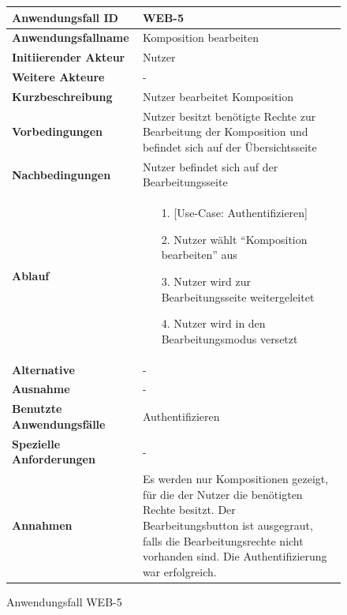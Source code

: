 \begin{figure}[h]
	\centering
	\begin{tabularx}{\textwidth}{ X | X }
		\textbf{Anwendungsfall ID} & WEB-5 \\ \hline
		\textbf{Anwendungsfallname} & Komposition bearbeiten \\ \hline
		\textbf{Initiierender Akteur} & Nutzer \\ \hline
		\textbf{Weitere Akteure} & - \\ \hline
		\textbf{Kurzbeschreibung} & Nutzer bearbeitet Komposition \\ \hline
		\textbf{Vorbedingungen} & Nutzer besitzt benötigte Rechte zur Bearbeitung der Komposition und befindet sich auf der Übersichtsseite \\ \hline
		\textbf{Nachbedingungen} & Nutzer befindet sich auf der Bearbeitungsseite \\ \hline
		\textbf{Ablauf} &
		\begin{enumerate}
			\item[1.] [Use-Case: Authentifizieren]
			\item[2.] Nutzer wählt ``Komposition bearbeiten'' aus
			\item[3.] Nutzer wird zur Bearbeitungsseite weitergeleitet
			\item[4.] Nutzer wird in den Bearbeitungsmodus versetzt
		\end{enumerate} \\ \hline
		\textbf{Alternative} & - \\ \hline
		\textbf{Ausnahme} & - \\ \hline
		\textbf{Benutzte Anwendungsfälle} & Authentifizieren \\ \hline
		\textbf{Spezielle Anforderungen} & - \\ \hline
		\textbf{Annahmen} & Es werden nur Kompositionen gezeigt, für die der Nutzer die benötigten Rechte besitzt.
                  Der Bearbeitungsbutton ist ausgegraut, falls die Bearbeitungsrechte nicht vorhanden sind. Die Authentifizierung war erfolgreich.
	\end{tabularx}
	\caption{Anwendungsfall WEB-5}
	\label{fig:anwendungsfall-server-tabelle-web-5}
\end{figure}

